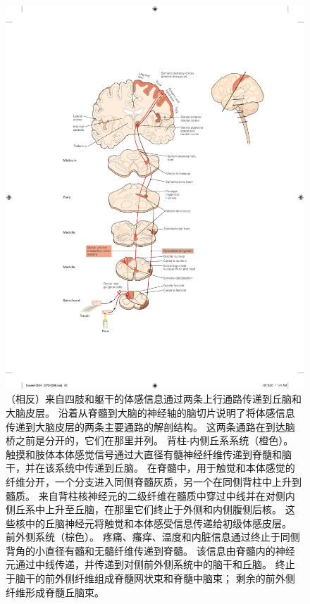 \begin{figure}[htbp]
	\centering
	\includegraphics[width=1.0\linewidth]{chap04/fig_4_6}
	\caption{（相反）来自四肢和躯干的体感信息通过两条上行通路传递到丘脑和大脑皮层。
		沿着从脊髓到大脑的神经轴的脑切片说明了将体感信息传递到大脑皮层的两条主要通路的解剖结构。
		这两条通路在到达脑桥之前是分开的，它们在那里并列。 背柱-内侧丘系系统（橙色）。
		触摸和肢体本体感觉信号通过大直径有髓神经纤维传递到脊髓和脑干，并在该系统中传递到丘脑。
		在脊髓中，用于触觉和本体感觉的纤维分开，一个分支进入同侧脊髓灰质，另一个在同侧背柱中上升到髓质。 
		来自背柱核神经元的二级纤维在髓质中穿过中线并在对侧内侧丘系中上升至丘脑，在那里它们终止于外侧和内侧腹侧后核。
		这些核中的丘脑神经元将触觉和本体感受信息传递给初级体感皮层。
		前外侧系统（棕色）。
		疼痛、瘙痒、温度和内脏信息通过终止于同侧背角的小直径有髓和无髓纤维传递到脊髓。
		该信息由脊髓内的神经元通过中线传递，并传递到对侧前外侧系统中的脑干和丘脑。
		终止于脑干的前外侧纤维组成脊髓网状束和脊髓中脑束； 剩余的前外侧纤维形成脊髓丘脑束。}
	\label{fig:4_6}
\end{figure}


